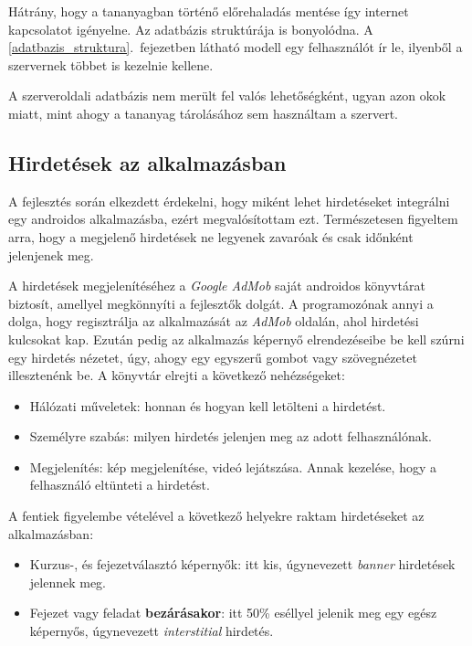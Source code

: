 \documentclass[12pt,a4paper]{article}
\begin{document}
	Hátrány, hogy a tananyagban történő előrehaladás mentése így internet kapcsolatot igényelne. Az adatbázis struktúrája is bonyolódna. A \ref{adatbazis_struktura}.\ fejezetben látható modell egy felhasználót ír le, ilyenből a szervernek többet is kezelnie kellene.
	
	A szerveroldali adatbázis nem merült fel valós lehetőségként, ugyan azon okok miatt, mint ahogy a tananyag tárolásához sem használtam a szervert.

	\subsection{Hirdetések az alkalmazásban}
	
	A fejlesztés során elkezdett érdekelni, hogy miként lehet hirdetéseket integrálni egy androidos alkalmazásba, ezért megvalósítottam ezt. Természetesen figyeltem arra, hogy a megjelenő hirdetések ne legyenek zavaróak és csak időnként jelenjenek meg.
	
	A hirdetések megjelenítéséhez a \textit{Google AdMob} saját androidos könyvtárat biztosít, amellyel megkönnyíti a fejlesztők dolgát. A programozónak annyi a dolga, hogy regisztrálja az alkalmazását az \textit{AdMob} oldalán, ahol hirdetési kulcsokat kap. Ezután pedig az alkalmazás képernyő elrendezéseibe be kell szúrni egy hirdetés nézetet, úgy, ahogy egy egyszerű gombot vagy szövegnézetet illesztenénk be. A könyvtár elrejti a következő nehézségeket:
	
	\begin{itemize}
		\item Hálózati műveletek: honnan és hogyan kell letölteni a hirdetést.
		\item Személyre szabás: milyen hirdetés jelenjen meg az adott felhasználónak.
		\item Megjelenítés: kép megjelenítése, videó lejátszása. Annak kezelése, hogy a felhasználó eltünteti a hirdetést.
	\end{itemize} 

	A fentiek figyelembe vételével a következő helyekre raktam hirdetéseket az alkalmazásban:
	
	\begin{itemize}
		\item Kurzus-, és fejezetválasztó képernyők: itt kis, úgynevezett \textit{banner} hirdetések jelennek meg.
		\item Fejezet vagy feladat \textbf{bezárásakor}: itt 50\% eséllyel jelenik meg egy egész képernyős, úgynevezett \textit{interstitial} hirdetés.
	\end{itemize}
\end{document}
